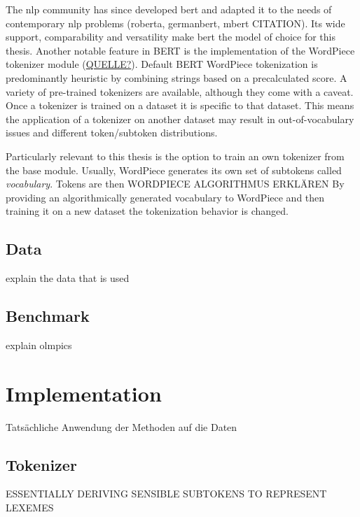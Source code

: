 \documentclass[english]{ttlab-qualify}
\begin{document}
    The \ac{nlp} community has since developed \ac{bert} and adapted it to the needs of contemporary \ac{nlp} problems (roberta, germanbert, mbert \uppercase{citation}).
    Its wide support, comparability and versatility make \ac{bert} the model of choice for this thesis.
    Another notable feature in \uppercase{bert} is the implementation of the WordPiece tokenizer module (\uppercase{\href{https://huggingface.co/course/chapter6/6?fw=pt}{quelle?}}).
    Default BERT WordPiece tokenization is predominantly heuristic by combining strings based on a precalculated score.
    A variety of pre-trained tokenizers are available, although they come with a caveat.
    Once a tokenizer is trained on a dataset it is specific to that dataset.
    This means the application of a tokenizer on another dataset may result in out-of-vocabulary issues and different token/subtoken distributions.

    Particularly relevant to this thesis is the option to train an own tokenizer from the base module.
    Usually, WordPiece generates its own set of subtokens called \textit{vocabulary}.
    Tokens are then \uppercase{WORDPIECE algorithmus erklären}
    By providing an algorithmically generated vocabulary to WordPiece and then training it on a new dataset the tokenization behavior is changed.




    \subsection{Data}
    \label{subsec:data}
    explain the data that is used

    \subsection{Benchmark}
    \label{subsec:benchmark}
    explain olmpics

    \section{Implementation}
    \label{sec:implementation}

    Tatsächliche Anwendung der Methoden auf die Daten

    \subsection{Tokenizer}
    \uppercase{essentially deriving sensible subtokens to represent lexemes}
    \label{subsec:tokenizer-training}
\end{document}
